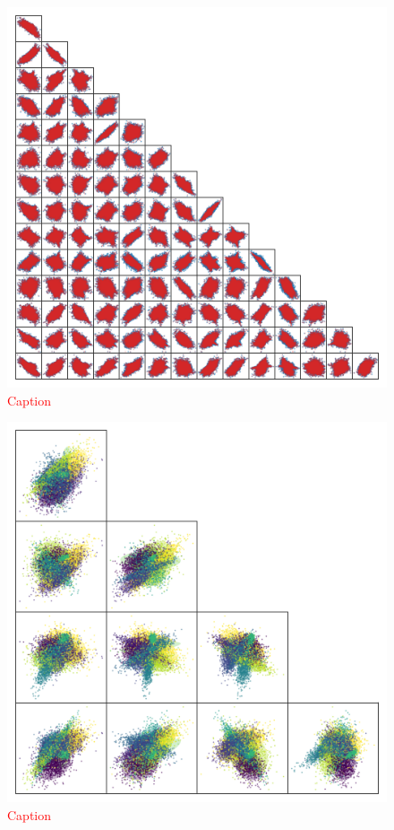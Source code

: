 \documentclass[twocolumn]{aastex61}
\newcommand{\todo}[1]{\textcolor{red}{#1}}
\begin{document}
\begin{figure}
	\includegraphics[width=1.0\textwidth]{experiments/toy-model-data.png}
    \caption{\todo{Caption}}
    \label{fig:toy-model-data}
\end{figure}


\begin{figure}
	\includegraphics[width=1.0\textwidth]{experiments/toy-model-latent-space.png}
    \caption{\todo{Caption}}
    \label{fig:toy-model-latent-space}
\end{figure}
\end{document}
